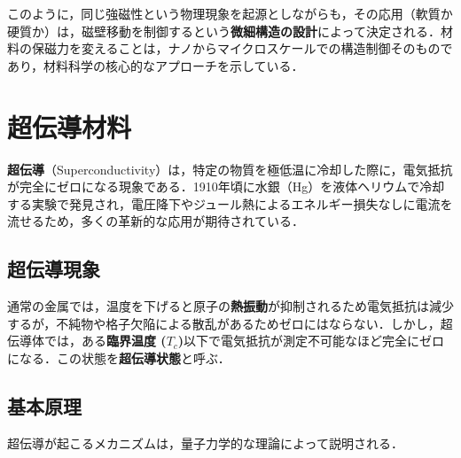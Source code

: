 \documentclass[11pt,a4paper]{ltjsarticle}
\newcommand{\supcite}[1]{\textsuperscript{\cite{#1}}}
\begin{document}
このように，同じ強磁性という物理現象を起源としながらも，その応用（軟質か硬質か）は，磁壁移動を制御するという\textbf{微細構造の設計}によって決定される．材料の保磁力を変えることは，ナノからマイクロスケールでの構造制御そのものであり，材料科学の核心的なアプローチを示している．

\section{超伝導材料}

\textbf{超伝導}（Superconductivity）は，特定の物質を極低温に冷却した際に，電気抵抗が完全にゼロになる現象である．1910年頃に水銀（Hg）を液体ヘリウムで冷却する実験で発見され，電圧降下やジュール熱によるエネルギー損失なしに電流を流せるため，多くの革新的な応用が期待されている\supcite{ref1}．

\subsection{超伝導現象}

通常の金属では，温度を下げると原子の\textbf{熱振動}が抑制されるため電気抵抗は減少するが，不純物や格子欠陥による散乱があるためゼロにはならない．しかし，超伝導体では，ある\textbf{臨界温度 ($T_c$)}以下で電気抵抗が測定不可能なほど完全にゼロになる\supcite{ref1}．この状態を\textbf{超伝導状態}と呼ぶ．

\subsection{基本原理}

超伝導が起こるメカニズムは，量子力学的な理論によって説明される．
\end{document}
